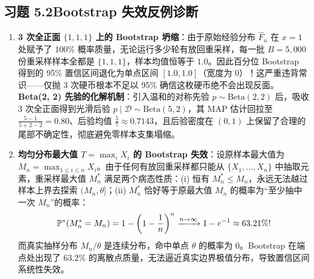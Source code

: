 \subsection*{习题 5.2\quad Bootstrap 失效反例诊断}
\begin{enumerate}[label=(\alph*), leftmargin=1.8em]
  \item \textbf{3 次全正面 $\{1, 1, 1\}$ 上的 Bootstrap 坍缩}：由于原始经验分布 $\hat{F}_n$ 在 $x=1$ 处赋予了 $100\%$ 概率质量，无论运行多少轮有放回重采样，每一批 $B = 5{,}000$ 份重采样样本全都是 $\{1, 1, 1\}$，样本均值恒等于 $1.0$。因此百分位 Bootstrap 得到的 95\% 置信区间退化为单点区间 $\mathbf{[1.0, 1.0]}$（宽度为 $0$）！这严重违背常识——仅抛 3 次硬币根本不足以 95\% 确信这枚硬币绝不会出现反面。\\
  \textbf{Beta(2, 2) 先验的化解机制}：引入温和的对称先验 $p \sim \mathrm{Beta}(2, 2)$ 后，吸收 3 次全正面得到光滑后验 $p \mid \mathcal{D} \sim \mathrm{Beta}(5, 2)$，其 MAP 估计回拉至 $\frac{5-1}{5+2-2} = 0.80$、后验均值 $\frac{5}{7} \approx 0.7143$，且后验密度在 $(0, 1)$ 上保留了合理的尾部不确定性，彻底避免零样本支集塌缩。
  \item \textbf{均匀分布最大值 $T = \max_i X_i$ 的 Bootstrap 失效}：设原样本最大值为 $M_n = \max_{1\le i\le n} X_i$。由于任何有放回重采样都只能从 $\{X_1, \dots, X_n\}$ 中抽取元素，重采样最大值 $M_n^*$ 满足两个病态性质：(i) 恒有 $M_n^* \le M_n$，永远无法越过样本上界去探索 $(M_n, \theta]$；(ii) $M_n^*$ 恰好等于原最大值 $M_n$ 的概率为“至少抽中一次 $M_n$”的概率：
  \[
    \mathbb{P}^*(M_n^* = M_n) = 1 - \left(1 - \frac{1}{n}\right)^n \xrightarrow{n\to\infty} 1 - e^{-1} \approx 63.21\%!
  \]
  而真实抽样分布 $M_n/\theta$ 是连续分布，命中单点 $\theta$ 的概率为 $0$。Bootstrap 在端点处出现了 $63.2\%$ 的离散点质量，无法逼近真实边界极值分布，导致置信区间系统性失效。
\end{enumerate}

